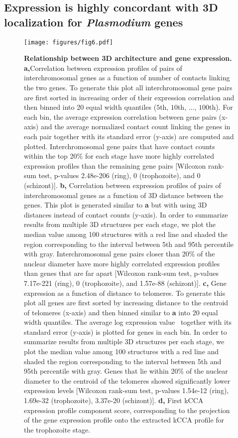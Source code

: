 \subsection{Expression is highly concordant with 3D localization for {\em Plasmodium} genes}


\begin{figure}[h]
\texttt{[image: figures/fig6.pdf]}
\centering
\caption{{\bf Relationship between 3D architecture and gene expression.}
\textbf{a,}Correlation between expression profiles of pairs of
interchromosomal genes as a function of number of contacts linking the two
genes. To generate this plot all interchromosomal gene pairs are first sorted
in increasing order of their expression correlation and then binned into 20
equal width quantiles ($5$th, $10$th, ..., $100$th). For each bin, the average
expression correlation between gene pairs (x-axis) and the average normalized
contact count linking the genes in each pair together with its standard error
(y-axis) are computed and plotted. Interchromosomal gene pairs that have
contact counts within the top 20\% for each stage have more highly correlated
expression profiles than the remaining gene pairs [Wilcoxon rank-sum test,
p-values 2.48e-206 (ring), 0 (trophozoite), and 0 (schizont)].
\textbf{b,} Correlation between expression profiles of pairs of
interchromosomal genes as a function of 3D distance between the genes. This
plot is generated similar to \textbf{a} but with using 3D distances instead of
contact counts (y-axis). In order to summarize results from multiple 3D
structures per each stage, we plot the median value among 100 structures with
a red line and shaded the region corresponding to the interval between 5th and
95th percentile with gray. Interchromosomal gene pairs closer than 20\% of the
nuclear diameter have more highly correlated expression profiles than genes
that are far apart [Wilcoxon rank-sum test, p-values 7.17e-221 (ring), 0
(trophozoite), and 1.57e-88 (schizont)].
\textbf{c,} Gene expression as a function of distance to telomeres. To
generate this plot all genes are first sorted by increasing distance to the
centroid of telomeres (x-axis) and then binned similar to \textbf{a} into 20
equal width quantiles. The average log expression
value~\citep{bunnik:polysome}
together with its standard error (y-axis) is plotted for genes in each bin. In
order to summarize results from multiple 3D structures per each stage, we plot
the median value among 100 structures with a red line and shaded the region
corresponding to the interval between 5th and 95th percentile with gray. Genes
that lie within 20\% of the nuclear diameter to the centroid of the telomeres
showed significantly lower expression levels [Wilcoxon rank-sum test, p-values
1.54e-12 (ring), 1.69e-32 (trophozoite), 3.37e-20 (schizont)].
\textbf{d,} First kCCA expression profile component score, corresponding to
the projection of the gene expression profile onto the extracted kCCA profile
for the trophozoite stage.}
\label{fig:fig6}
\end{figure}




